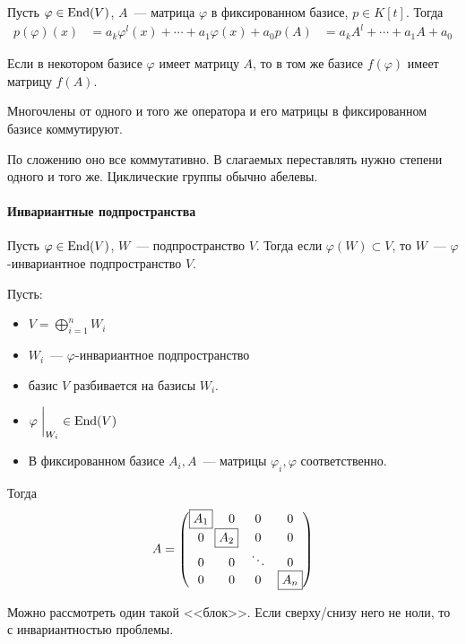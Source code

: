 \documentclass[12pt]{../../../notes}
\begin{document}
\setcounter{paragraph}{11}
\begin{defn}\label{defn:linop::poly::poly}
  Пусть $\varphi\in \operatorname{End}(V)$, $A$~--- матрица $\varphi$ в фиксированном базисе, $p\in K[t]$.
  Тогда
  \begin{align*}
    p(\varphi)(x) &= a_k \varphi^l(x) + \dotsb + a_1 \varphi(x) + a_0
    p(A) &= a_k A^l + \dotsb + a_1 A + a_0
  \end{align*}
\end{defn}
\begin{lem}\label{lem:linop::poly::mtxoprel}
  Если в некотором базисе $\varphi$ имеет матрицу $A$, то в том же базисе $f(\varphi)$ имеет
  матрицу $f(A)$.
\end{lem}
\begin{lem}\label{lem:linop::poly::commute}
  Многочлены от одного и того же оператора и его матрицы в фиксированном базисе коммутируют.
\end{lem}
\begin{itlproof}
  По сложению оно все коммутативно. В слагаемых переставлять нужно степени одного и того же.
  Циклические группы обычно абелевы.
\end{itlproof}

\paragraph{ Инвариантные подпространства }
\begin{defn}\label{defn:linop::invsubsp::invsubsp}
  Пусть $\varphi\in \operatorname{End}(V)$, $W$~--- подпространство $V$. Тогда если $\varphi(W) \subset V$,
  то $W$~--- $\varphi$-инвариантное подпространство $V$.
\end{defn}

\begin{lem}\label{lem:linop::invsubsb::dirsum}
  Пусть:
  \begin{itemize}
    \item $V = \bigoplus_{i=1}^n W_i$
    \item $W_{i}$~--- $\varphi$-инвариантное подпространство
    \item базис $V$ разбивается на базисы $W_i$.
    \item $\varphi\left.\vphantom{g_{\int}}\right|_{W_i} \in \End(V)$
    \item В фиксированном базисе $A_i, A$~--- матрицы $\varphi_i, \varphi$ соответственно. 
  \end{itemize}
  Тогда
  \[
    A = 
    \begin{pmatrix}
      \boxed{A_1} & 0   & 0      & 0    \\
      0   & \mkern -15mu \boxed{A_2} & 0      & 0    \\
      0   & 0   & \ddots & 0    \\
      0   & 0   & 0      & \boxed{A_n}  \\
    \end{pmatrix}
  \]
\end{lem}
\begin{itlproof}
  Можно рассмотреть один такой <<блок>>. Если сверху/снизу него не ноли, то с инвариантностью
  проблемы. 
\end{itlproof}
\end{document}
